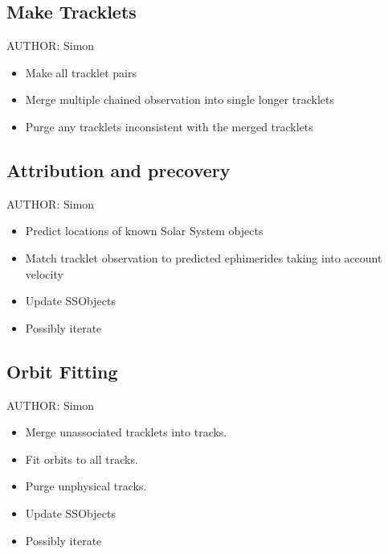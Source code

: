 \subsection{Make Tracklets}
AUTHOR: Simon
\begin{itemize}
\item Make all tracklet pairs
\item Merge multiple chained observation into single longer tracklets
\item Purge any tracklets inconsistent with the merged tracklets
\end{itemize}

\subsection{Attribution and precovery}
AUTHOR: Simon
\begin{itemize}
\item Predict locations of known Solar System objects
\item Match tracklet observation to predicted ephimerides taking into account velocity
\item Update SSObjects
\item Possibly iterate
\end{itemize}

\subsection{Orbit Fitting}
AUTHOR: Simon
\begin{itemize}
\item Merge unassociated tracklets into tracks.
\item Fit orbits to all tracks.
\item Purge unphysical tracks.
\item Update SSObjects
\item Possibly iterate
\end{itemize}
